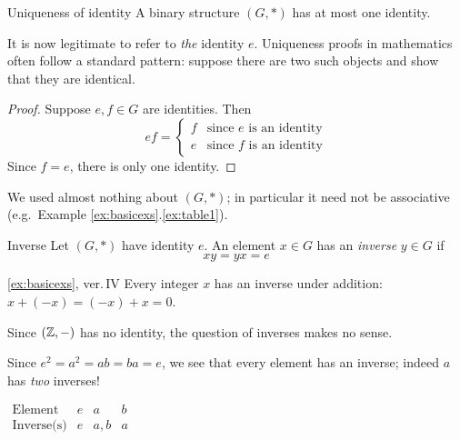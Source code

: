 \begin{lemm}{Uniqueness of identity}{}
	A binary structure $(G,\ast)$ has at most one identity.
\end{lemm}

It is now legitimate to refer to \emph{the} identity $e$. Uniqueness proofs in mathematics often follow a standard pattern: suppose there are two such objects and show that they are identical.

\begin{proof}
	Suppose $e,f\in G$ are identities. Then
	\[
		ef=
		\begin{cases}
			f&\text{since $e$ is an identity}\\
			e&\text{since $f$ is an identity}
		\end{cases}
	\]
	Since $f=e$, there is only one identity.
\end{proof}

We used almost nothing about $(G,*)$; in particular it need not be associative (e.g.\ Example \ref*{ex:basicexs}.\ref{ex:table1}).

\begin{defn}{Inverse}{}
	Let $(G,*)$ have identity $e$. An element $x\in G$ has an \emph{inverse} $y\in G$ if
	\[
		xy=yx=e
	\]
\end{defn}

\begin{examples*}{\ref{ex:basicexs}, ver.\,IV}{}
	\exstart Every integer $x$ has an inverse under addition: $x+(-x)=(-x)+x=0$.\vspace{0pt}
	\begin{enumerate}\setcounter{enumi}{1}\itemsep2pt
	  \item Since $(\mathbb{Z},-)$ has no identity, the question of inverses makes no sense.
	  
	  \begin{minipage}[t]{0.7\linewidth}\vspace{-2pt}
	  	\item Since $e^2=a^2=ab=ba=e$, we see that every element has an inverse; indeed $a$ has \emph{two} inverses!
	  \end{minipage}
	  \hfill
	  \begin{minipage}[t]{0.29\linewidth}\vspace{-2pt}
		  \flushright
		  $\begin{array}{l||c|c|c}
		  	\text{Element}&e&a&b\\\hline
		  	\text{Inverse(s)}&e&a,b&a
		  \end{array}$
	  \end{minipage}
	\end{enumerate}
\end{examples*}



